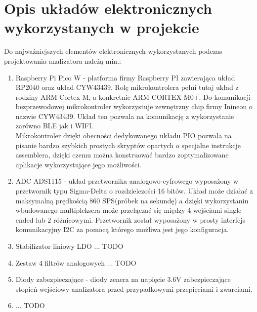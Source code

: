 \section{Opis układów elektronicznych wykorzystanych w projekcie}

Do najważniejszych elementów elektronicznych wykorzystanych 
podczas projektowania analizatora należą min.:
 
\begin{enumerate}
    \item Raspberry Pi Pico W - platforma firmy Raspberry PI zawierająca 
    układ RP2040 oraz układ CYW43439. Rolę mikrokontrolera pełni
    tutaj układ z rodziny ARM Cortex M, a konkretnie ARM CORTEX M0+.
    Do komunikacji bezprzewodowej mikrokontroler wykorzystuje zewnętrzny 
    chip firmy Inineon o nazwie CYW43439. Układ ten pozwala na komunikację
    z wykorzystanie zarówno BLE jak i WIFI. \\
    Mikrokontroler dzięki obecności dedykowanego układu PIO pozwala na 
    pisanie bardzo szybkich prostych skryptów opartych o specjalne instrukcje assemblera,
    dzięki czemu można konstruować bardzo zoptymalizowane aplikacje wykorzystujące jego
    możliwości.   
    \item ADC ADS1115 - układ przetwornika analogowo-cyfrowego wyposażony  w przetwornik
    typu Sigma-Delta o rozdzielczości 16 bitów. Układ może działać z maksymalną
    prędkością 860 SPS(próbek na sekundę) a dzięki wykorzystaniu wbudowanego multipleksera
    może przełączać się między 4 wejściami single ended lub 2 różnicowymi. Przetwornik 
    został wyposażony w prosty interfejs komunikacyjny I2C za pomocą którego możliwa
    jest jego konfiguracja. 
    \item Stabilizator liniowy LDO ... TODO
    \item Zestaw 4 filtrów analogowych ... TODO  
    \item Diody zabezpieczające - diody zenera na napięcie 3.6V zabezpieczające
    stopień wejściowy analizatora przed przypadkowymi przepięciami i zwarciami.
    \item ... TODO
\end{enumerate}
